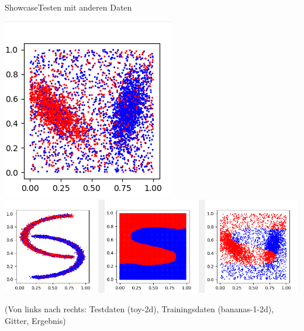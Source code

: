 \documentclass[9pt]{beamer}
\begin{document}
\begin{frame}{Showcase}{Testen mit anderen Daten}
\begin{center}\includegraphics[scale=0.33]{assets/toy-2d.png}\includegraphics[scale=0.33]{assets/changed_test_data2.png}\end{center}
\begin{center}\begin{tiny}(Von links nach rechts: Testdaten (toy-2d), Trainingsdaten (bananas-1-2d), Gitter, Ergebnis)\end{tiny}\end{center}
\end{frame}
\end{document}
